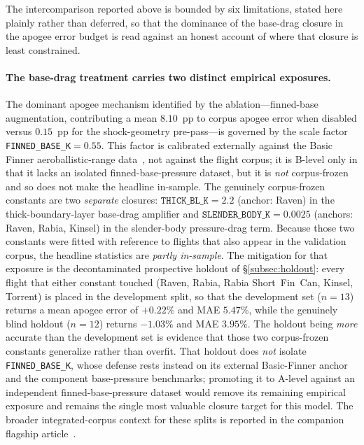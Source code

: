 
The intercomparison reported above is bounded by six limitations, stated here
plainly rather than deferred, so that the dominance of the base-drag closure in
the apogee error budget is read against an honest account of where that closure
is least constrained.

\paragraph{The base-drag treatment carries two distinct empirical exposures.}
The dominant apogee mechanism identified by the ablation---finned-base
augmentation, contributing a mean $8.10$~pp to corpus apogee error when disabled
versus $0.15$~pp for the shock-geometry pre-pass---is governed by the scale
factor \texttt{FINNED\_BASE\_K}$=0.55$. This factor is calibrated externally
against the Basic Finner aeroballistic-range data~\cite{dupuis1997}, not against
the flight corpus; it is B-level only in that it lacks an isolated
finned-base-pressure dataset, but it is \emph{not} corpus-frozen and so does not
make the headline in-sample. The genuinely corpus-frozen constants are two
\emph{separate} closures: $\texttt{THICK\_BL\_K}=2.2$ (anchor: Raven) in the
thick-boundary-layer base-drag amplifier and $\texttt{SLENDER\_BODY\_K}=0.0025$
(anchors: Raven, Rabia, Kinsel) in the slender-body pressure-drag term. Because
those two constants were fitted with reference to flights that also appear in the
validation corpus, the headline statistics are \emph{partly in-sample}. The
mitigation for that exposure is the decontaminated prospective holdout of
\S\ref{subsec:holdout}: every flight that either constant touched (Raven, Rabia,
Rabia Short~Fin~Can, Kinsel, Torrent) is placed in the development split, so that
the development set ($n=13$) returns a mean apogee error of $+0.22\%$ and MAE
$5.47\%$, while the genuinely blind holdout ($n=12$) returns $-1.03\%$ and MAE
$3.95\%$. The holdout being \emph{more} accurate than the development set is
evidence that those two corpus-frozen constants generalize rather than overfit.
That holdout does \emph{not} isolate \texttt{FINNED\_BASE\_K}, whose defense
rests instead on its external Basic-Finner anchor and the component
base-pressure benchmarks; promoting it to A-level against an independent
finned-base-pressure dataset would remove its remaining empirical exposure and
remains the single most valuable closure target for this model. The broader
integrated-corpus context for these splits is reported in the companion flagship
article~\cite{yu2026jsr}.

